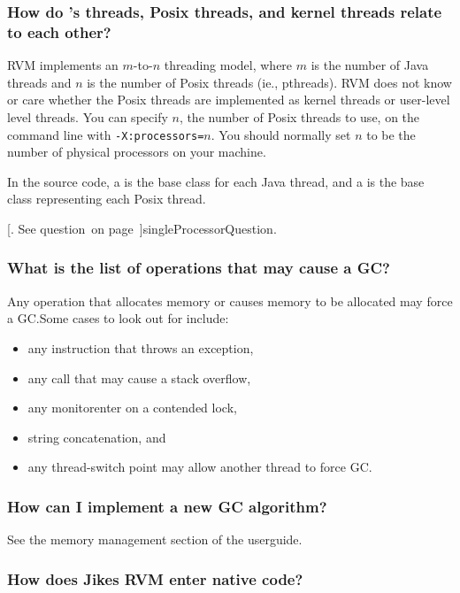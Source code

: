 \subsubsection{How do \jrvm{}'s threads, Posix threads, and kernel
threads relate to each other?}

RVM implements an $m$-to-$n$ threading model, where $m$ is the number of 
Java threads and $n$ is the number of Posix threads (ie., pthreads).  RVM
does not know or care whether the Posix threads are implemented as kernel
threads or user-level level threads.  You can specify $n$, the number of
Posix threads to use, on the command line with {\tt -X:processors=$n$}.
You should normally set $n$ to be the number of physical processors on
your machine.  

In the source code, a 
is the base class for each Java
thread, and a 
is the base class representing each
Posix thread.  

[.  See 
question~\Ref on page~\Pageref]{singleProcessorQuestion}.

\subsubsection{What is the list of operations that may cause a GC?}

Any operation that allocates memory or causes memory to be allocated may
force a GC.\@  Some cases to look out for include:
\begin{itemize}
\item any instruction that throws an exception,
\item any call that may cause a stack overflow,
\item any {\instruction monitorenter} on a contended lock,
\item string concatenation, and
\item any thread-switch point may allow another thread to force GC.\@
\end{itemize}

\subsubsection{How can I implement a new GC algorithm?}

See the memory management section of the userguide.

\subsubsection{How does Jikes RVM enter native code?}

